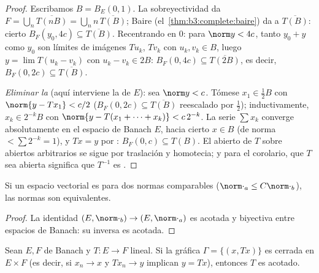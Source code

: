 \begin{proof}
Escribamos $B = B_E(0,1)$. La sobreyectividad da $F = \bigcup_n
\overline{T(nB)} = \bigcup_n n\,\overline{T(B)}$; Baire
(el~\cref{thm:b3:complete:baire}) da
 a $\overline{T(B)}$: cierto
$B_F(y_0, 4c) \subseteq
\overline{T(B)}$. Recentrando en $0$:
para $\norm y < 4c$, tanto $y_0 + y$ como $y_0$ son límites de imágenes
$Tu_k$, $Tv_k$ con $u_k, v_k \in B$, luego $y = \lim T(u_k - v_k)$ con
$u_k - v_k
\in 2B$: $B_F(0, 4c) \subseteq \overline{T(2B)}$, es decir,
$B_F(0, 2c) \subseteq \overline{T(B)}$.

\emph{Eliminar la } (aquí
interviene la  de $E$):
sea $\norm y < c$. Tómese $x_1 \in \frac12 B$ con $\norm{y -
Tx_1} < c/2$ ($B_F(0,2c) \subseteq \overline{T(B)}$ reescalado por
$\frac12$); inductivamente, $x_k \in 2^{-k}B$ con $\norm{y -
T(x_1 + \dots + x_k)} < c\,2^{-k}$. La serie $\sum x_k$ converge
absolutamente en el espacio de Banach $E$, hacia cierto $x \in B$ (de
norma $<
\sum 2^{-k} = 1$), y $Tx = y$ por
: $B_F(0, c)
\subseteq T(B)$. El  abierto de $T$ sobre abiertos arbitrarios
se sigue por traslación y homotecia; y para el corolario, que $T$ sea
abierta significa que $T^{-1}$ es
.
\end{proof}

\begin{corollary}\label{cor:b3:banach:equivnorms}
Si un espacio vectorial es 
para dos normas comparables ($\norm\cdot_a \leq C\norm\cdot_b$), las
normas son equivalentes.
\end{corollary}

\begin{proof}
La identidad $(E, \norm\cdot_b) \to (E, \norm\cdot_a)$ es acotada y
biyectiva entre espacios de Banach: su inversa es acotada.
\end{proof}

\begin{theorem}\label{thm:b3:banach:closedgraph}
Sean $E, F$ de Banach y $T \colon E \to F$ lineal. Si la gráfica
$\Gamma = \{(x, Tx)\}$ es cerrada en $E \times F$ (es decir, si
$x_n \to x$ y $Tx_n \to y$ implican $y = Tx$), entonces $T$ es
acotado.
\end{theorem}


